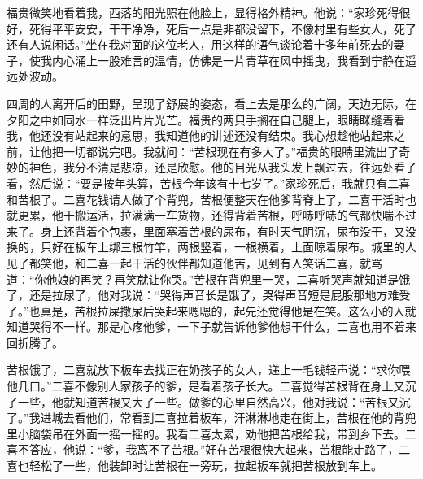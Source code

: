 \documentclass[12pt,UTF8]{ctexbook}
\begin{document}
福贵微笑地看着我，西落的阳光照在他脸上，显得格外精神。他说：“家珍死得很好，死得平平安安，干干净净，死后一点是非都没留下，不像村里有些女人，死了还有人说闲话。”坐在我对面的这位老人，用这样的语气谈论着十多年前死去的妻子，使我内心涌上一股难言的温情，仿佛是一片青草在风中摇曳，我看到宁静在遥远处波动。

四周的人离开后的田野，呈现了舒展的姿态，看上去是那么的广阔，天边无际，在夕阳之中如同水一样泛出片片光芒。福贵的两只手搁在自己腿上，眼睛眯缝着看我，他还没有站起来的意思，我知道他的讲述还没有结束。我心想趁他站起来之前，让他把一切都说完吧。我就问：“苦根现在有多大了。”福贵的眼睛里流出了奇妙的神色，我分不清是悲凉，还是欣慰。他的目光从我头发上飘过去，往远处看了看，然后说：“要是按年头算，苦根今年该有十七岁了。”家珍死后，我就只有二喜和苦根了。二喜花钱请人做了个背兜，苦根便整天在他爹背脊上了，二喜干活时也就更累，他干搬运活，拉满满一车货物，还得背着苦根，呼哧呼哧的气都快喘不过来了。身上还背着个包裹，里面塞着苦根的尿布，有时天气阴沉，尿布没干，又没换的，只好在板车上绑三根竹竿，两根竖着，一根横着，上面晾着尿布。城里的人见了都笑他，和二喜一起干活的伙伴都知道他苦，见到有人笑话二喜，就骂道：“你他娘的再笑？再笑就让你哭。”苦根在背兜里一哭，二喜听哭声就知道是饿了，还是拉尿了，他对我说：“哭得声音长是饿了，哭得声音短是屁股那地方难受了。”也真是，苦根拉屎撒尿后哭起来嗯嗯的，起先还觉得他是在笑。这么小的人就知道哭得不一样。那是心疼他爹，一下子就告诉他爹他想干什么，二喜也用不着来回折腾了。

苦根饿了，二喜就放下板车去找正在奶孩子的女人，递上一毛钱轻声说：“求你喂他几口。”二喜不像别人家孩子的爹，是看着孩子长大。二喜觉得苦根背在身上又沉了一些，他就知道苦根又大了一些。做爹的心里自然高兴，他对我说：“苦根又沉了。”我进城去看他们，常看到二喜拉着板车，汗淋淋地走在街上，苦根在他的背兜里小脑袋吊在外面一摇一摇的。我看二喜太累，劝他把苦根给我，带到乡下去。二喜不答应，他说：“爹，我离不了苦根。”好在苦根很快大起来，苦根能走路了，二喜也轻松了一些，他装卸时让苦根在一旁玩，拉起板车就把苦根放到车上。
\end{document}
